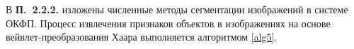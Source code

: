 В \textbf{П.~2.2.2.} изложены численные методы сегментации изображений в системе ОКФП. Процесс извлечения признаков объектов в изображениях на основе вейвлет-преобразования Хаара выполняется алгоритмом \ref{alg5}.
%
%
%
%
%
%
%
%
%
%
%
%

